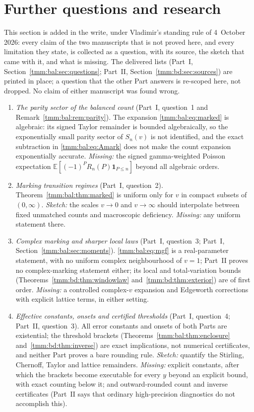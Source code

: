 \documentclass[11pt,letterpaper]{article}
\theoremstyle{remark}\newtheorem{remark}[theorem]{Remark}
\newcommand{\E}{\mathbb E}\newcommand{\Pp}{\mathbb P}
\newcommand{\one}{\mathbf 1}\newcommand{\TV}{d_{\mathrm{TV}}}
\begin{document}
\section{Further questions and research}\label{tmm:sec:further}
This section is added in the write, under Vladimir's standing rule of 4~October 2026: every claim of the two manuscripts that is not proved here, and every limitation they state, is collected as a question, with its source, the sketch that came with it, and what is missing. The delivered lists (Part~I, Section~\ref{tmm:bal:sec:questions}; Part~II, Section~\ref{tmm:bd:sec:sources}) are printed in place; a question that the other Part answers is re-scoped here, not dropped. No claim of either manuscript was found wrong.
\begin{enumerate}
\item\label{tmm:q:parity} \emph{The parity sector of the balanced count} (Part~I, question~1 and Remark~\ref{tmm:bal:rem:parity}). The expansion \eqref{tmm:bal:eq:marked} is algebraic: its signed Taylor remainder is bounded algebraically, so the exponentially small parity sector of $S_n(v)$ is not identified, and the exact subtraction in \eqref{tmm:bal:eq:Amark} does not make the count expansion exponentially accurate. \emph{Missing:} the signed gamma-weighted Poisson expectation $\E[(-1)^PR_n(P)\one_{P\le n}]$ beyond all algebraic orders.
\item\label{tmm:q:marking} \emph{Marking transition regimes} (Part~I, question~2). Theorem~\ref{tmm:bal:thm:marked} is uniform only for $v$ in compact subsets of $(0,\infty)$. \emph{Sketch:} the scales $v\to0$ and $v\to\infty$ should interpolate between fixed unmatched counts and macroscopic deficiency. \emph{Missing:} any uniform statement there.
\item\label{tmm:q:complex} \emph{Complex marking and sharper local laws} (Part~I, question~3; Part~I, Section~\ref{tmm:bal:sec:moments}). \eqref{tmm:bal:eq:mgf} is a real-parameter statement, with no uniform complex neighbourhood of $v=1$; Part~II proves no complex-marking statement either; its local and total-variation bounds (Theorems~\ref{tmm:bd:thm:windowlaw} and~\ref{tmm:bd:thm:exterior}) are of first order. \emph{Missing:} a controlled complex-$v$ expansion and Edgeworth corrections with explicit lattice terms, in either setting.
\item\label{tmm:q:effective} \emph{Effective constants, onsets and certified thresholds} (Part~I, question~4; Part~II, question~3). All error constants and onsets of both Parts are existential; the threshold brackets (Theorems~\ref{tmm:bal:thm:enclosure} and~\ref{tmm:bd:thm:inverse}) are exact implications, not numerical certificates, and neither Part proves a bare rounding rule. \emph{Sketch:} quantify the Stirling, Chernoff, Taylor and lattice remainders. \emph{Missing:} explicit constants, after which the brackets become executable for every $y$ beyond an explicit bound, with exact counting below it; and outward-rounded count and inverse certificates (Part~II says that ordinary high-precision diagnostics do not accomplish this).

\end{enumerate}
\end{document}
